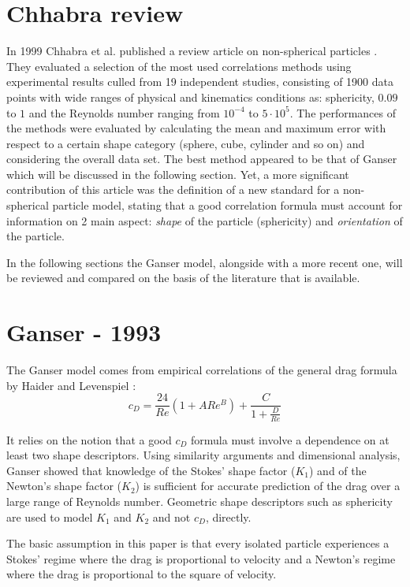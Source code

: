 	\section{Chhabra review}
		In 1999 Chhabra et al. published a review article on non-spherical particles \cite{ChhabraEtAl-1999}. They evaluated a selection of the most used correlations methods using experimental results culled from 19 independent studies, consisting of 1900 data points with wide ranges of physical and kinematics conditions as: sphericity, $ 0.09 $ to $ 1 $ and the Reynolds number ranging from $ 10^{-4} $ to $  5 \cdot 10^{5} $. The performances of the methods were evaluated by calculating the mean and maximum error with respect to a certain shape category (sphere, cube, cylinder and so on) and considering the overall data set. 
		The best method appeared to be that of Ganser \cite{Ganser-1993} which will be discussed in the following section.
		Yet, a more significant contribution of this article was the definition
		of a new standard for a non-spherical particle model, stating that a good correlation formula must account for information on 2 main aspect: \textit{shape} of the particle (sphericity) and \textit{orientation} of the particle. 
		
		In the following sections the Ganser model, alongside with a more recent one, will be reviewed and compared on the basis of the literature that is available. 
		
	\section{Ganser - 1993}
		The Ganser model \cite{Ganser-1993} comes from empirical correlations of the general drag formula by Haider and Levenspiel \cite{HaiderLevenspiel-1989}:
		\begin{equation}
			c_D = \frac{24}{Re} (1 + A Re^B) + \dfrac{C}{1 + \frac{D}{Re}}
		\end{equation}
	
		It relies on the notion that a good $ c_D $ formula must involve a dependence on at least two shape descriptors. Using similarity arguments and dimensional analysis, Ganser showed that knowledge of the Stokes' shape factor ($ K_1 $) and of the Newton's shape factor ($ K_2 $) is sufficient for accurate prediction of the drag over a large range of Reynolds number. 
		Geometric shape descriptors such as sphericity are used	to model $ K_1 $ and $ K_2 $ and not $ c_D $, directly.
		
		The basic assumption in this paper is that every isolated particle experiences a Stokes’ regime where the drag is proportional to velocity and a Newton’s regime where the drag is proportional to the square of velocity. 
		
